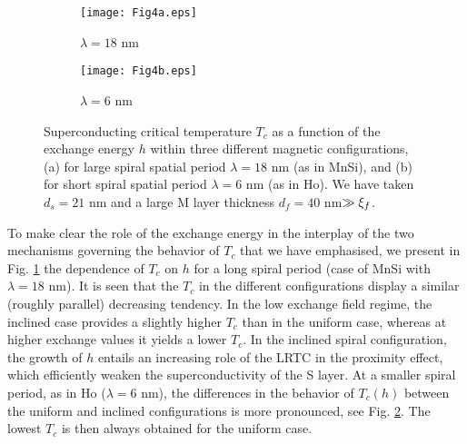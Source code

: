 \documentclass[prb,amsmath,amssymb,reprint]{revtex4-2}
\begin{document}
\begin{figure*}[htb]
\begin{subfigure}{.5\textwidth}
  \texttt{[image: Fig4a.eps]}
  \caption{$\lambda=18$ nm}
  \label{Fig4a}
\end{subfigure}%
\begin{subfigure}{.5\textwidth}
  \texttt{[image: Fig4b.eps]}
  \caption{$\lambda=6$ nm}
  \label{Fig4b}
\end{subfigure}
\caption{
Superconducting critical temperature $T_c$ as a
function of the exchange energy $h$ within three different magnetic configurations, (a) for large spiral spatial period $\lambda=18$ nm (as in MnSi), and (b) for short spiral spatial period $\lambda=6$ nm (as in Ho). We have taken $d_s=21$ nm and a large M layer thickness $%
d_f=40$ nm$ \gg\protect\xi_f$.
}
\label{Fig4}
\end{figure*}

To make clear the role of the exchange energy in the interplay of the two
mechanisms governing the behavior of $T_c$ that we have emphasised, we present in Fig. \ref{Fig4a} the dependence of $T_c$ on $h$ for a long spiral period (case of MnSi with $\lambda=18$ nm). It is seen that the
$T_c$ in the different configurations
display a similar (roughly parallel) decreasing tendency. In the low exchange field regime, the inclined case provides a slightly higher $T_c$ than in the uniform case, whereas at higher exchange values it yields a lower $T_c$.
 In the inclined spiral configuration, the growth of $h$ entails an increasing role of the LRTC in the proximity effect, which efficiently weaken the superconductivity of the S layer.
At a smaller spiral period, as in Ho ($\lambda=6$ nm), the differences in the behavior of $T_c(h)$  between the uniform and inclined configurations is more pronounced,  see Fig. \ref{Fig4b}. The lowest $T_c$ is then always obtained for the uniform case.
\end{document}
